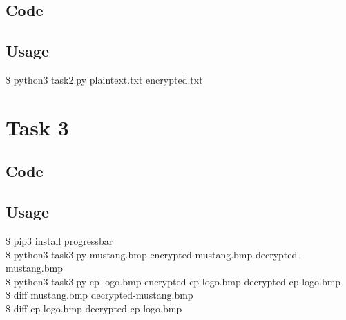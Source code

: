 \documentclass[11pt]{article}
\begin{document}
  \subsection{Code}
    
  \subsection{Usage}
    {\tt\begin{tabbing}                                                                                                                                                                     
       \$ python3 task2.py plaintext.txt encrypted.txt\\
      \end{tabbing}}

\section{Task 3}
  \subsection{Code}
    
  \subsection{Usage}
    {\tt\begin{tabbing}                                                                                                                                                                     
      \$ pip3 install progressbar\\
      \$ python3 task3.py mustang.bmp encrypted-mustang.bmp decrypted-mustang.bmp\\
      \$ python3 task3.py cp-logo.bmp encrypted-cp-logo.bmp decrypted-cp-logo.bmp\\
      \$ diff mustang.bmp decrypted-mustang.bmp\\
      \$ diff cp-logo.bmp decrypted-cp-logo.bmp\\
    \end{tabbing}}
\end{document}
